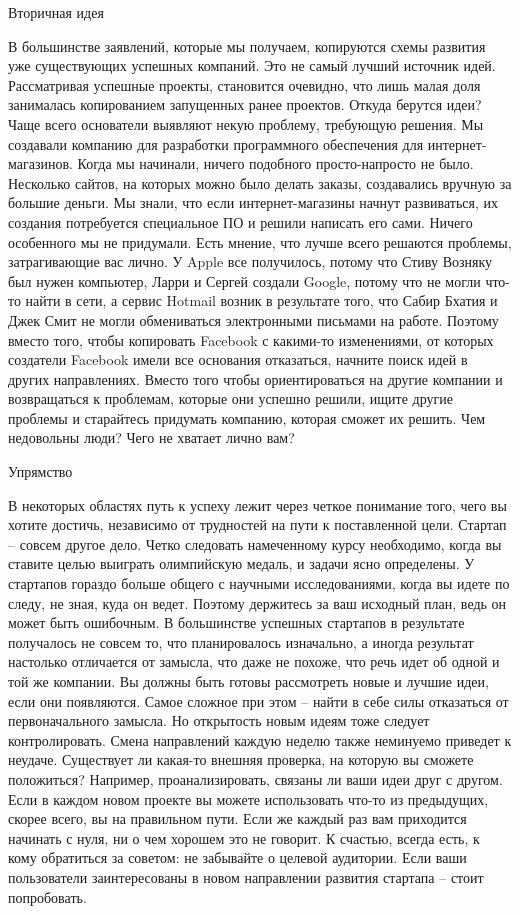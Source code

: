 \documentclass[ebook,12pt,oneside,openany]{memoir}
\begin{document}
Вторичная идея

В большинстве заявлений, которые мы получаем, копируются схемы
развития уже существующих успешных компаний. Это не самый лучший
источник идей. Рассматривая успешные проекты, становится очевидно, что
лишь малая доля занималась копированием запущенных ранее проектов.
Откуда берутся идеи? Чаще всего основатели выявляют некую проблему,
требующую решения. Мы создавали компанию для разработки программного
обеспечения для интернет-магазинов. Когда мы начинали, ничего
подобного просто-напросто не было. Несколько сайтов, на которых можно
было делать заказы, создавались вручную за большие деньги. Мы знали,
что если интернет-магазины начнут развиваться, их создания потребуется
специальное ПО и решили написать его сами. Ничего особенного мы не
придумали. Есть мнение, что лучше всего решаются проблемы,
затрагивающие вас лично. У Apple все получилось, потому что Стиву
Возняку был нужен компьютер, Ларри и Сергей создали Google, потому что
не могли что-то найти в сети, а сервис Hotmail возник в результате
того, что Сабир Бхатия и Джек Смит не могли обмениваться электронными
письмами на работе. Поэтому вместо того, чтобы копировать Facebook с
какими-то изменениями, от которых создатели Facebook имели все
основания отказаться, начните поиск идей в других направлениях. Вместо
того чтобы ориентироваться на другие компании и возвращаться к
проблемам, которые они успешно решили, ищите другие проблемы и
старайтесь придумать компанию, которая сможет их решить. Чем
недовольны люди? Чего не хватает лично вам?

Упрямство

В некоторых областях путь к успеху лежит через четкое понимание того,
чего вы хотите достичь, независимо от трудностей на пути к
поставленной цели. Стартап – совсем другое дело. Четко следовать
намеченному курсу необходимо, когда вы ставите целью выиграть
олимпийскую медаль, и задачи ясно определены. У стартапов гораздо
больше общего с научными исследованиями, когда вы идете по следу, не
зная, куда он ведет. Поэтому держитесь за ваш исходный план, ведь он
может быть ошибочным. В большинстве успешных стартапов в результате
получалось не совсем то, что планировалось изначально, а иногда
результат настолько отличается от замысла, что даже не похоже, что
речь идет об одной и той же компании. Вы должны быть готовы
рассмотреть новые и лучшие идеи, если они появляются. Самое сложное
при этом – найти в себе силы отказаться от первоначального замысла. Но
открытость новым идеям тоже следует контролировать. Смена направлений
каждую неделю также неминуемо приведет к неудаче. Существует ли
какая-то внешняя проверка, на которую вы сможете положиться? Например,
проанализировать, связаны ли ваши идеи друг с другом. Если в каждом
новом проекте вы можете использовать что-то из предыдущих, скорее
всего, вы на правильном пути. Если же каждый раз вам приходится
начинать с нуля, ни о чем хорошем это не говорит. К счастью, всегда
есть, к кому обратиться за советом: не забывайте о целевой аудитории.
Если ваши пользователи заинтересованы в новом направлении развития
стартапа – стоит попробовать.
\end{document}
